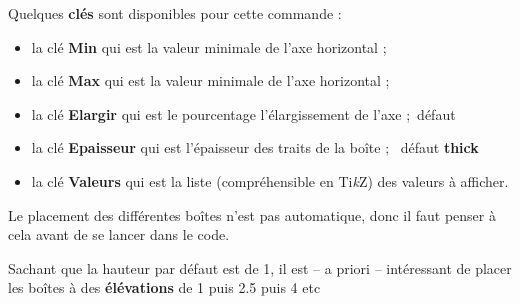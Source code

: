 \documentclass[a4paper,french,11pt]{article}
\providecommand\tikzlogo{Ti\textit{k}Z}
\let\TikZ\tikzlogo
\newcommand\Cle[1]{{\bfseries\sffamily\textlangle #1\textrangle}}
\begin{document}
\begin{PresCodePL}{}
\end{PresCodePL}

\begin{PresCodePL}{}
\end{PresCodePL}

\begin{cautionblock}
Quelques \Cle{clés} sont disponibles pour cette commande :

\begin{itemize}
	\item la clé \Cle{Min} qui est la valeur minimale de l'axe horizontal ;
	\item la clé \Cle{Max} qui est la valeur minimale de l'axe horizontal ;
	\item la clé \Cle{Elargir} qui est le pourcentage l'élargissement de l'axe ;\hfill~défaut \Cle{0.1}
	\item la clé \Cle{Epaisseur} qui est l'épaisseur des traits de la boîte ; \hfill~défaut \Cle{thick}
	\item la clé \Cle{Valeurs} qui est la liste (compréhensible en \TikZ) des valeurs à afficher.
\end{itemize}
\vspace*{-\baselineskip}\leavevmode
\end{cautionblock}

\begin{PresCodePL}{}
\end{PresCodePL}

\begin{noteblock}
Le placement des différentes boîtes n'est pas automatique, donc il faut penser à cela avant de se lancer dans le code.

Sachant que la hauteur par défaut est de 1, il est -- a priori -- intéressant de placer les boîtes à des \Cle{élévations} de \num{1} puis \num{2.5} puis \num{4} etc
\end{noteblock}
\end{document}
